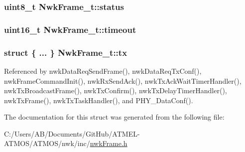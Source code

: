 \hypertarget{struct_nwk_frame__t_ad6257c1abbda87dc2a653a6086f8e9e5}{
\subsubsection[{status}]{\setlength{\rightskip}{0pt plus 5cm}uint8\-\_\-t Nwk\-Frame\-\_\-t\-::status}}\label{struct_nwk_frame__t_ad6257c1abbda87dc2a653a6086f8e9e5}
\hypertarget{struct_nwk_frame__t_a3c49425f94b27976baefc90d1549ffab}{
\subsubsection[{timeout}]{\setlength{\rightskip}{0pt plus 5cm}uint16\-\_\-t Nwk\-Frame\-\_\-t\-::timeout}}\label{struct_nwk_frame__t_a3c49425f94b27976baefc90d1549ffab}
\hypertarget{struct_nwk_frame__t_ab5e3dc31787a24bb22a62465358d71ba}{
\subsubsection[{tx}]{\setlength{\rightskip}{0pt plus 5cm}struct \{ ... \}   Nwk\-Frame\-\_\-t\-::tx}}\label{struct_nwk_frame__t_ab5e3dc31787a24bb22a62465358d71ba}


Referenced by nwk\-Data\-Req\-Send\-Frame(), nwk\-Data\-Req\-Tx\-Conf(), nwk\-Frame\-Command\-Init(), nwk\-Rx\-Send\-Ack(), nwk\-Tx\-Ack\-Wait\-Timer\-Handler(), nwk\-Tx\-Broadcast\-Frame(), nwk\-Tx\-Confirm(), nwk\-Tx\-Delay\-Timer\-Handler(), nwk\-Tx\-Frame(), nwk\-Tx\-Task\-Handler(), and P\-H\-Y\-\_\-\-Data\-Conf().



The documentation for this struct was generated from the following file\-:\begin{DoxyCompactItemize}
\item 
C\-:/\-Users/\-A\-B/\-Documents/\-Git\-Hub/\-A\-T\-M\-E\-L-\/\-A\-T\-M\-O\-S/\-A\-T\-M\-O\-S/nwk/inc/\hyperlink{nwk_frame_8h}{nwk\-Frame.\-h}\end{DoxyCompactItemize}
